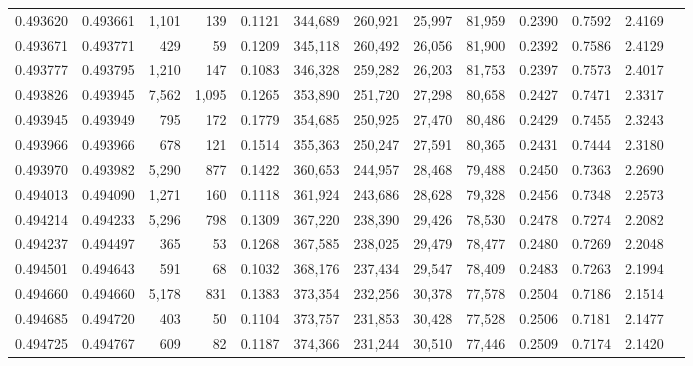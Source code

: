 \begin{tabular}{rrrrrrrrrrrrr}
0.493620 & 0.493661 & 1,101 &   139 &                                     0.1121 & 344,689 & 260,921 &  25,997 &  81,959 & 0.2390 & 0.7592 & 2.4169 \\
0.493671 & 0.493771 &   429 &    59 &                                     0.1209 & 345,118 & 260,492 &  26,056 &  81,900 & 0.2392 & 0.7586 & 2.4129 \\
0.493777 & 0.493795 & 1,210 &   147 &                                     0.1083 & 346,328 & 259,282 &  26,203 &  81,753 & 0.2397 & 0.7573 & 2.4017 \\
0.493826 & 0.493945 & 7,562 & 1,095 &                                     0.1265 & 353,890 & 251,720 &  27,298 &  80,658 & 0.2427 & 0.7471 & 2.3317 \\
0.493945 & 0.493949 &   795 &   172 &                                     0.1779 & 354,685 & 250,925 &  27,470 &  80,486 & 0.2429 & 0.7455 & 2.3243 \\
0.493966 & 0.493966 &   678 &   121 &                                     0.1514 & 355,363 & 250,247 &  27,591 &  80,365 & 0.2431 & 0.7444 & 2.3180 \\
0.493970 & 0.493982 & 5,290 &   877 &                                     0.1422 & 360,653 & 244,957 &  28,468 &  79,488 & 0.2450 & 0.7363 & 2.2690 \\
0.494013 & 0.494090 & 1,271 &   160 &                                     0.1118 & 361,924 & 243,686 &  28,628 &  79,328 & 0.2456 & 0.7348 & 2.2573 \\
0.494214 & 0.494233 & 5,296 &   798 &                                     0.1309 & 367,220 & 238,390 &  29,426 &  78,530 & 0.2478 & 0.7274 & 2.2082 \\
0.494237 & 0.494497 &   365 &    53 &                                     0.1268 & 367,585 & 238,025 &  29,479 &  78,477 & 0.2480 & 0.7269 & 2.2048 \\
0.494501 & 0.494643 &   591 &    68 &                                     0.1032 & 368,176 & 237,434 &  29,547 &  78,409 & 0.2483 & 0.7263 & 2.1994 \\
0.494660 & 0.494660 & 5,178 &   831 &                                     0.1383 & 373,354 & 232,256 &  30,378 &  77,578 & 0.2504 & 0.7186 & 2.1514 \\
0.494685 & 0.494720 &   403 &    50 &                                     0.1104 & 373,757 & 231,853 &  30,428 &  77,528 & 0.2506 & 0.7181 & 2.1477 \\
0.494725 & 0.494767 &   609 &    82 &                                     0.1187 & 374,366 & 231,244 &  30,510 &  77,446 & 0.2509 & 0.7174 & 2.1420 \\

\end{tabular}
